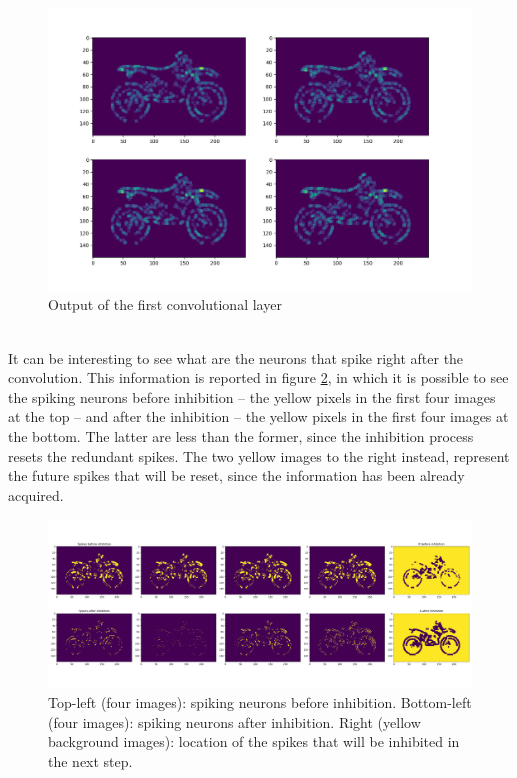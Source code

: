 \documentclass[11pt,a4paper]{scrartcl}
\begin{document}
\begin{figure}[!h]
	\centering
	\includegraphics[width=\textwidth]{images/conv_output_slice3_cut}
	\caption{Output of the first convolutional layer}
	\label{fig:conv_out}
\end{figure}\\
It can be interesting to see what are the neurons that spike right after the convolution. This information is reported in figure \ref{fig:s_k}, in which it is possible to see the spiking neurons before inhibition -- the yellow pixels in the first four images at the top -- and after the inhibition -- the yellow pixels in the first four images at the bottom. The latter are less than the former, since the inhibition process resets the redundant spikes. The two yellow images to the right instead, represent the future spikes that will be reset, since the information has been already acquired.\\
\begin{figure}[!h]
	\centering
	\includegraphics[width=\textwidth]{images/S_K_values_slice2}
	\caption{Top-left (four images): spiking neurons before inhibition. Bottom-left (four images): spiking neurons after inhibition. Right (yellow background images): location of the spikes that will be inhibited in the next step.}
	\label{fig:s_k}
\end{figure}\\
\end{document}
